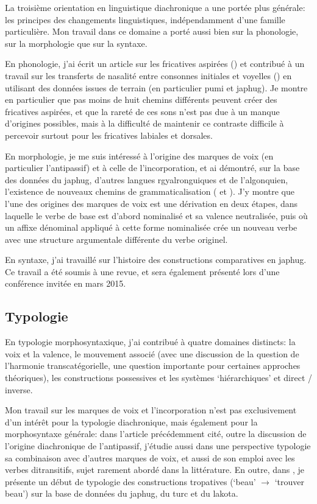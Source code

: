 \documentclass[oldfontcommands,oneside,a4paper,11pt]{article}
\begin{document}
 La troisième orientation en linguistique diachronique a une portée plus générale: les principes des changements linguistiques, indépendamment d'une famille particulière. Mon travail dans ce domaine a porté aussi bien sur la phonologie, sur la morphologie que sur la syntaxe.
 
 En phonologie, j'ai écrit un article sur les fricatives aspirées (\citealt{jacques11lingua}) et contribué à un travail sur les transferts de nasalité entre consonnes initiales et voyelles (\citealt{michaud-jacques12nasalite}) en utilisant des données issues de terrain (en particulier pumi et japhug). Je montre en particulier que pas moins de huit chemins différents peuvent créer des fricatives aspirées, et que la rareté de ces sons n'est pas due à un manque d'origines possibles, mais à la difficulté de maintenir ce contraste difficile à percevoir surtout pour les fricatives labiales et dorsales.  
 
En morphologie, je me suis intéressé à l'origine des marques de voix (en particulier l'antipassif) et à celle de l'incorporation, et ai démontré, sur la base des données du japhug, d'autres langues rgyalronguiques et de l'algonquien, l'existence de nouveaux chemins de grammaticalisation  (\citealt{jacques12incorp} et \citealt{jacques14antipassive}). J'y montre que l'une des origines des marques de voix est une dérivation en deux étapes, dans laquelle le verbe de base est d'abord nominalisé et sa valence neutralisée, puis où  un affixe dénominal appliqué à cette forme nominalisée crée un nouveau verbe avec une structure argumentale différente du verbe originel. 

En syntaxe, j'ai travaillé sur l'histoire des constructions comparatives en japhug. Ce travail a été soumis à une revue, et sera également présenté lors d'une conférence invitée en mars 2015.
 
 
\subsection{Typologie}  \label{sec:typologie}
En typologie morphosyntaxique, j'ai contribué à quatre domaines distincts: la voix et la valence, le mouvement associé (avec une discussion de la question de l'harmonie transcatégorielle, une question importante pour certaines approches théoriques), les constructions possessives et les systèmes  `hiérarchiques' et direct / inverse.

Mon travail sur les marques de voix et l'incorporation n'est pas exclusivement d'un intérêt pour la typologie diachronique, mais également pour la morphosyntaxe générale: dans l'article \citet{jacques14antipassive} précédemment cité, outre la discussion de l'origine diachronique de l'antipassif, j'étudie aussi dans une perspective typologie sa combinaison avec d'autres marques de voix, et aussi de son emploi avec les verbes ditransitifs, sujet rarement abordé dans la littérature. En outre, dans \citet{jacques13tropative}, je présente un début de typologie des constructions tropatives (`beau' $\rightarrow$ `trouver beau') sur la base de données du japhug, du turc et du lakota. 
\end{document}
